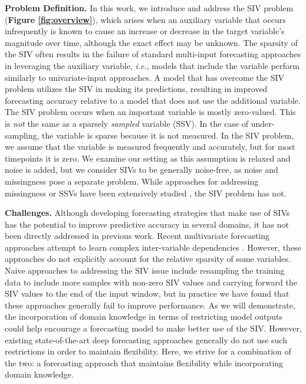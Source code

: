 \documentclass[letterpaper]{article}
\begin{document}
\textbf{Problem Definition.} In this work, we introduce and address the SIV problem (\textbf{Figure \ref{fig:overview}}), which arises when an auxiliary variable that occurs infrequently is known to cause an increase or decrease in the target variable's magnitude over time, although the exact effect may be unknown. The sparsity of the SIV often results in the failure of standard multi-input forecasting approaches in leveraging the auxiliary variable, \textit{i.e.}, models that include the variable perform similarly to univariate-input approaches. A model that has overcome the SIV problem utilizes the SIV in making its predictions, resulting in improved forecasting accuracy relative to a model that does not use the additional variable. The SIV problem occurs when an important variable is mostly zero-valued. This is \textit{not} the same as a sparsely \textit{sampled} variable (SSV). In the case of under-sampling, the variable is sparse because it is not measured. In the SIV problem, we assume that the variable is measured frequently and accurately, but for most timepoints it is zero. We examine our setting as this assumption is relaxed and noise is added, but we consider SIVs to be generally noise-free, as noise and missingness pose a separate problem. While approaches for addressing missingness or SSVs have been extensively studied \cite{missing}, the SIV problem has not. 


\textbf{Challenges.} Although developing forecasting strategies that  make use of SIVs has the potential to improve predictive accuracy in several domains, it has not been directly addressed in previous work.  Recent multivariate forecasting approaches attempt to learn complex inter-variable dependencies \cite{attention1,cnn2,sharedmulti}. However, these approaches do not explicitly account for the relative sparsity of some variables. Naive approaches to addressing the SIV issue include resampling the training data to include more samples with non-zero SIV values and carrying forward the SIV values to the end of the input window, but in practice we have found that these approaches generally fail to improve performance.  As we will demonstrate, the incorporation of domain knowledge in terms of restricting model outputs could help encourage a forecasting model to make better use of the SIV. However, existing state-of-the-art deep forecasting approaches generally do not use such restrictions in order to maintain flexibility. Here, we strive for a combination of the two: a forecasting approach that maintains flexibility while incorporating domain knowledge.
\end{document}
